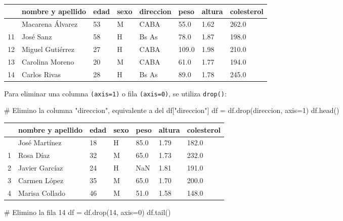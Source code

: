 \documentclass[
  letterpaper,
  DIV=11,
  numbers=noendperiod]{scrreprt}
\newenvironment{Shaded}{\begin{snugshade}}{\end{snugshade}}
\newcommand{\CommentTok}[1]{\textcolor[rgb]{0.37,0.37,0.37}{#1}}
\newcommand{\DecValTok}[1]{\textcolor[rgb]{0.68,0.00,0.00}{#1}}
\newcommand{\NormalTok}[1]{\textcolor[rgb]{0.00,0.23,0.31}{#1}}
\newcommand{\OperatorTok}[1]{\textcolor[rgb]{0.37,0.37,0.37}{#1}}
\newcommand{\StringTok}[1]{\textcolor[rgb]{0.13,0.47,0.30}{#1}}
\begin{document}
\begin{longtable}[]{@{}llllllll@{}}
\toprule\noalign{}
& nombre y apellido & edad & sexo & direccion & peso & altura &
colesterol \\
\midrule\noalign{}
\endhead
\bottomrule\noalign{}
\endlastfoot
10 & Macarena Álvarez & 53 & M & CABA & 55.0 & 1.62 & 262.0 \\
11 & José Sanz & 58 & H & Bs As & 78.0 & 1.87 & 198.0 \\
12 & Miguel Gutiérrez & 27 & H & CABA & 109.0 & 1.98 & 210.0 \\
13 & Carolina Moreno & 20 & M & CABA & 61.0 & 1.77 & 194.0 \\
14 & Carlos Rivas & 28 & H & Bs As & 89.0 & 1.78 & 245.0 \\
\end{longtable}

Para eliminar una columna \texttt{(axis=1)} o fila \texttt{(axis=0)}, se
utiliza \texttt{drop()}:

\begin{Shaded}
\begin{Highlighting}[]
\CommentTok{\# Elimino la columna "direccion", equivalente a del df["direccion"]}
\NormalTok{df }\OperatorTok{=}\NormalTok{ df.drop(}\StringTok{\textquotesingle{}direccion\textquotesingle{}}\NormalTok{, axis}\OperatorTok{=}\DecValTok{1}\NormalTok{)  }
\NormalTok{df.head()}
\end{Highlighting}
\end{Shaded}

\begin{longtable}[]{@{}lllllll@{}}
\toprule\noalign{}
& nombre y apellido & edad & sexo & peso & altura & colesterol \\
\midrule\noalign{}
\endhead
\bottomrule\noalign{}
\endlastfoot
0 & José Martínez & 18 & H & 85.0 & 1.79 & 182.0 \\
1 & Rosa Díaz & 32 & M & 65.0 & 1.73 & 232.0 \\
2 & Javier Garcíaz & 24 & H & NaN & 1.81 & 191.0 \\
3 & Carmen López & 35 & M & 65.0 & 1.70 & 200.0 \\
4 & Marisa Collado & 46 & M & 51.0 & 1.58 & 148.0 \\
\end{longtable}

\begin{Shaded}
\begin{Highlighting}[]
\CommentTok{\# Elimino la fila 14}
\NormalTok{df }\OperatorTok{=}\NormalTok{ df.drop(}\DecValTok{14}\NormalTok{, axis}\OperatorTok{=}\DecValTok{0}\NormalTok{) }
\NormalTok{df.tail()}
\end{Highlighting}
\end{Shaded}
\end{document}
